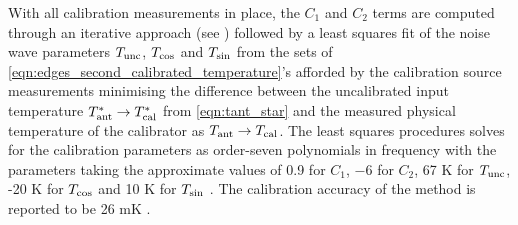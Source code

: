 With all calibration measurements in place, the $C_1$ and $C_2$ terms are computed through an iterative approach (see \citet{edgesCal}) followed by a least squares fit of the noise wave parameters $T_{\mathrm{unc}}$, $T_{\mathrm{cos}}$ and $T_{\mathrm{sin}}$ from the sets of \cref{eqn:edges_second_calibrated_temperature}’s afforded by the calibration source measurements minimising the difference between the uncalibrated input temperature $T_{\mathrm{ant}}^* \rightarrow T_{\mathrm{cal}}^*$ from \cref{eqn:tant_star} and the measured physical temperature of the calibrator as $T_{\mathrm{ant}} \rightarrow T_{\mathrm{cal}}$. The least squares procedures solves for the calibration parameters as order-seven polynomials in frequency with the parameters taking the approximate values of 0.9 for $C_1$, $-6$ for $C_2$, 67 K for $T_{\mathrm{unc}}$, -20 K for $T_{\mathrm{cos}}$ and 10 K for $T_{\mathrm{sin}}$ \citep{edgesCal}. The calibration accuracy of the method is reported to be 26 mK \citep{edgesCal}.



